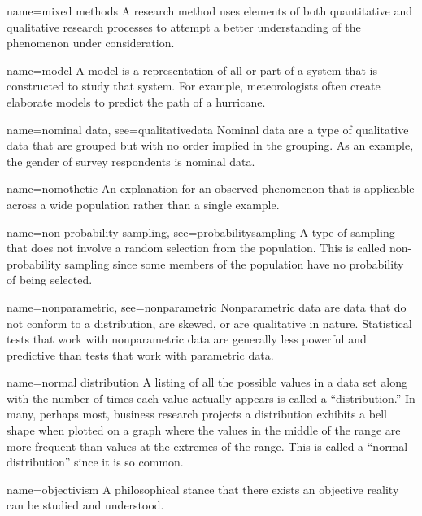 {name={mixed methods}}
{%
	A research method uses elements of both quantitative and qualitative research processes to attempt a better understanding of the phenomenon under consideration.
}

{name={model}}
{%
	A model is a representation of all or part of a system that is constructed to study that system. For example, meteorologists often create elaborate models to predict 	the path of a hurricane. 
}

{name={nominal data},
	see={qualitativedata}}
{%
	Nominal data are a type of qualitative data that are grouped but with no order implied in the grouping. As an example, the gender of survey respondents is nominal data.
}

{name={nomothetic}}
{%
	An explanation for an observed phenomenon that is applicable across a wide population rather than a single example.
}

{name={non-probability sampling},
	see={probabilitysampling}}
{%
	A type of sampling that does not involve a random selection from the population. This is called non-probability sampling since some members of the population have no probability of being selected.
}

{name={nonparametric},
	see={nonparametric}}
{%
	Nonparametric data are data that do not conform to a distribution, are skewed, or are qualitative in nature. Statistical tests that work with nonparametric data are generally less powerful and predictive than tests that work with parametric data.
}

{name={normal distribution}}
{%
	A listing of all the possible values in a data set along with the number of times each value actually appears is called a ``distribution.'' In many, perhaps most, business research projects a distribution exhibits a bell shape when plotted on a graph where the values in the middle of the range are more frequent than values at the extremes of the range. This is called a ``normal distribution'' since it is so common.
}

{name={objectivism}}
{%
	A philosophical stance that there exists an objective reality can be studied and understood.
}


